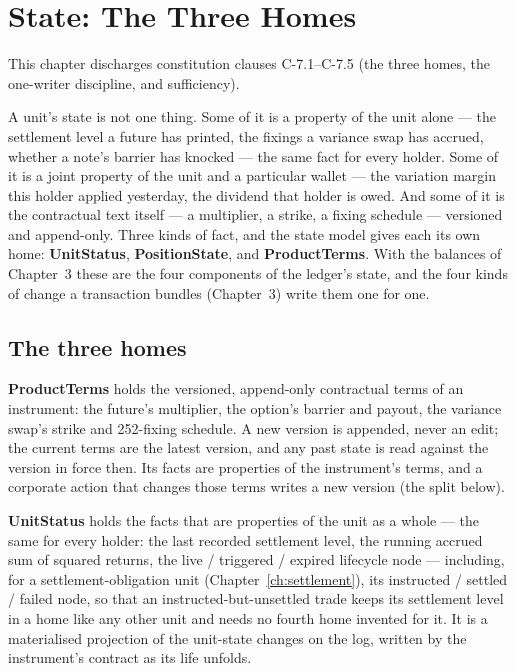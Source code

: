 \documentclass[11pt,a4paper]{article}
\begin{document}
\section{State: The Three Homes}\label{ch:homes}

This chapter discharges constitution clauses C-7.1--C-7.5 (the three homes, the one-writer discipline, and sufficiency).

A unit's state is not one thing. Some of it is a property of the unit alone --- the
settlement level a future has printed, the fixings a variance swap has accrued, whether a
note's barrier has knocked --- the same fact for every holder. Some of it is a joint
property of the unit and a particular wallet --- the variation margin this holder applied
yesterday, the dividend that holder is owed. And some of it is the contractual text
itself --- a multiplier, a strike, a fixing schedule --- versioned and append-only. Three
kinds of fact, and the state model gives each its own home: \textbf{UnitStatus},
\textbf{PositionState}, and \textbf{ProductTerms}. With the balances of Chapter~3
these are the four components of the ledger's state, and the four kinds of change a
transaction bundles (Chapter~3) write them one for one.

\subsection{The three homes}

\textbf{ProductTerms} holds the versioned, append-only contractual terms of an
instrument: the future's multiplier, the option's barrier and payout, the variance swap's
strike and 252-fixing schedule. A new version is appended, never an edit; the current
terms are the latest version, and any past state is read against the version in force
then. Its facts are properties of the instrument's terms, and a corporate action that
changes those terms writes a new version (the split below).

\textbf{UnitStatus} holds the facts that are properties of the unit as a whole --- the
same for every holder: the last recorded settlement level, the running accrued sum of
squared returns, the live / triggered / expired lifecycle node --- including, for a
settlement-obligation unit (Chapter~\ref{ch:settlement}), its instructed / settled /
failed node, so that an instructed-but-unsettled trade keeps its settlement level in a
home like any other unit and needs no fourth home invented for it. It is a materialised
projection of the unit-state changes on the log, written by the instrument's contract as
its life unfolds.
\end{document}
